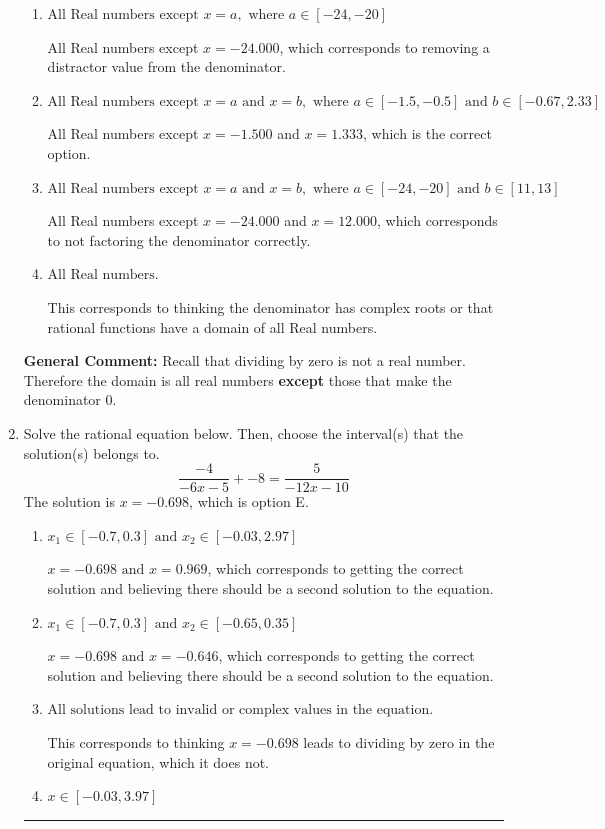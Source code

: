 \documentclass{extbook}[14pt]
\newcommand{\litem}[1]{\item #1

\rule{\textwidth}{0.4pt}}
\begin{document}
\begin{enumerate}
{\begin{enumerate}[label=\Alph*.]
All Real numbers except $x = -1.500$, which corresponds to removing only 1 value from the denominator.
\item \( \text{All Real numbers except } x = a, \text{ where } a \in [-24, -20] \)

All Real numbers except $x = -24.000$, which corresponds to removing a distractor value from the denominator.
\item \( \text{All Real numbers except } x = a \text{ and } x = b, \text{ where } a \in [-1.5, -0.5] \text{ and } b \in [-0.67, 2.33] \)

All Real numbers except $x = -1.500$ and $x = 1.333$, which is the correct option.
\item \( \text{All Real numbers except } x = a \text{ and } x = b, \text{ where } a \in [-24, -20] \text{ and } b \in [11, 13] \)

All Real numbers except $x = -24.000$ and $x = 12.000$, which corresponds to not factoring the denominator correctly.
\item \( \text{All Real numbers.} \)

This corresponds to thinking the denominator has complex roots or that rational functions have a domain of all Real numbers.
\end{enumerate}

\textbf{General Comment:} Recall that dividing by zero is not a real number. Therefore the domain is all real numbers \textbf{except} those that make the denominator 0.
}
\litem{
Solve the rational equation below. Then, choose the interval(s) that the solution(s) belongs to.
\[ \frac{-4}{-6x -5} + -8 = \frac{5}{-12x -10} \]The solution is \( x = -0.698 \), which is option E.\begin{enumerate}[label=\Alph*.]
\item \( x_1 \in [-0.7, 0.3] \text{ and } x_2 \in [-0.03,2.97] \)

$x = -0.698 \text{ and } x = 0.969$, which corresponds to getting the correct solution and believing there should be a second solution to the equation.
\item \( x_1 \in [-0.7, 0.3] \text{ and } x_2 \in [-0.65,0.35] \)

$x = -0.698 \text{ and } x = -0.646$, which corresponds to getting the correct solution and believing there should be a second solution to the equation.
\item \( \text{All solutions lead to invalid or complex values in the equation.} \)

This corresponds to thinking $x = -0.698$ leads to dividing by zero in the original equation, which it does not.
\item \( x \in [-0.03,3.97] \)


\end{enumerate}}
\end{enumerate}
\end{document}
